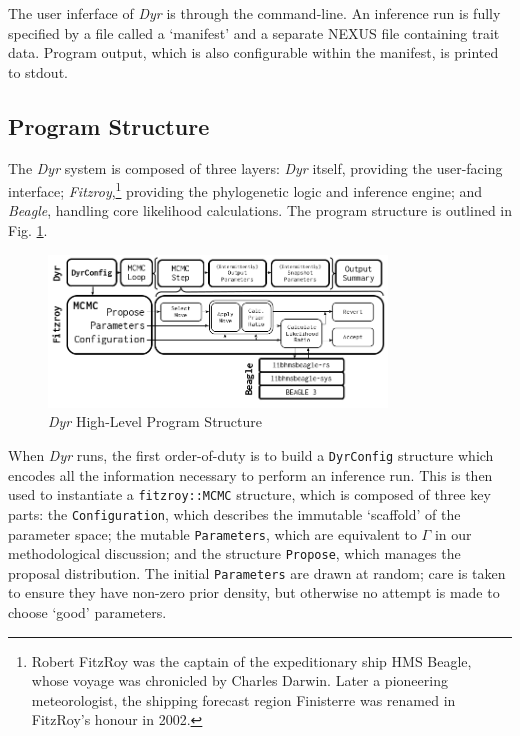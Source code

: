 \documentclass[10pt,journal,compsoc]{IEEEtran}
\begin{document}
The user inferface of \textit{Dyr} is through the command-line. An inference run is fully specified by a file called a `manifest' and a separate NEXUS file containing trait data. Program output, which is also configurable within the manifest, is printed to stdout.

\subsection{Program Structure}

The \textit{Dyr} system is composed of three layers: \textit{Dyr} itself, providing the user-facing interface; \textit{Fitzroy},\footnote{Robert FitzRoy was the captain of the expeditionary ship HMS Beagle, whose voyage was chronicled by Charles Darwin. Later a pioneering meteorologist, the shipping forecast region Finisterre was renamed in FitzRoy's honour in 2002.} providing the phylogenetic logic and inference engine; and \textit{Beagle}, handling core likelihood calculations. The program structure is outlined in Fig. \ref{fig:program}.

\begin{figure}
\caption{\textit{Dyr} High-Level Program Structure}\label{fig:program}
\vspace{0.2cm}
\includegraphics[width=9cm,center]{progdiagram}
\end{figure}

When \textit{Dyr} runs, the first order-of-duty is to build a \texttt{DyrConfig} structure which encodes all the information necessary to perform an inference run. This is then used to instantiate a \texttt{fitzroy::MCMC} structure, which is composed of three key parts: the \texttt{Configuration}, which describes the immutable `scaffold' of the parameter space; the mutable \texttt{Parameters}, which are equivalent to $\Gamma$ in our methodological discussion; and the structure \texttt{Propose}, which manages the proposal distribution. The initial \texttt{Parameters} are drawn at random; care is taken to ensure they have non-zero prior density, but otherwise no attempt is made to choose `good' parameters.
\end{document}
